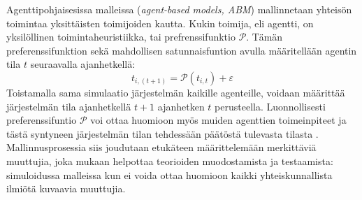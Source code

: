 \documentclass[finnish,gradu,twoside,12pt]{tktltiki}
\begin{document}
Agenttipohjaisesissa malleissa (\textit{agent-based models, ABM}) mallinnetaan yhteisön toimintaa yksittäisten toimijoiden kautta. Kukin toimija, eli agentti, on yksilöllinen toimintaheuristiikka, tai prefrenssifunktio $\mathcal{P}$. Tämän preferenssifunktion sekä mahdollisen satunnaisfuntion avulla määritellään agentin tila $t$ seuraavalla ajanhetkellä: $$t_{i,(t+1)} = \mathcal{P}( t_{i,t} ) + \varepsilon$$ Toistamalla sama simulaatio järjestelmän kaikille agenteille, voidaan määrittää järjestelmän tila ajanhetkellä $t+1$ ajanhetken $t$ perusteella. Luonnollisesti preferenssifuntio $\mathcal{P}$ voi ottaa huomioon myös muiden agenttien toimeinpiteet ja tästä syntyneen järjestelmän tilan tehdessään päätöstä tulevasta tilasta \citep[esimerkiksi][]{Bonabeau2002}. Mallinnusprosessia siis joudutaan etukäteen määrittelemään merkittäviä muuttujia, joka \citet{Gilbert1993} mukaan helpottaa teorioiden muodostamista ja testaamista: simuloidussa malleissa kun ei voida ottaa huomioon kaikki yhteiskunnallista ilmiötä kuvaavia muuttujia.
\end{document}
